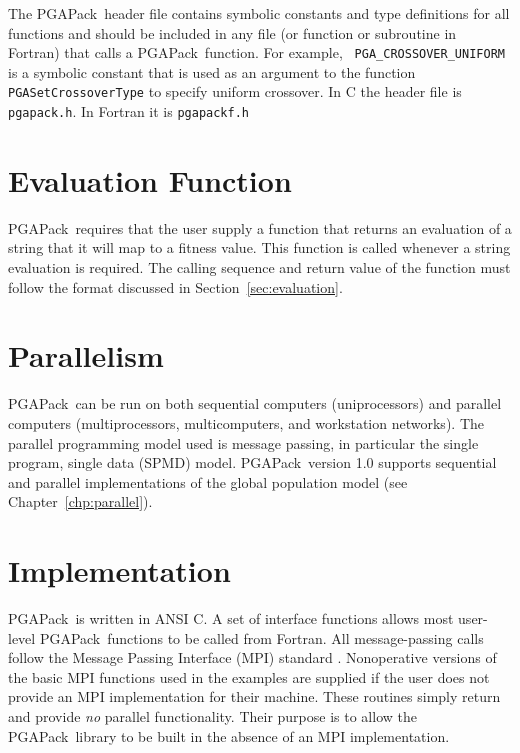 \documentclass{report}
\newcommand{\pga}{PGAPack}
\begin{document}
\begin{sloppypar}
The \pga\ header file contains symbolic constants and type definitions for all
functions and should be included in any file (or function or subroutine in
Fortran) that calls a \pga\ function.  For example, {\tt
PGA\_CROSSOVER\_UNIFORM} is a symbolic constant that is used as an argument
to the function {\tt PGASetCrossoverType} to specify uniform crossover.  In C
the header file is {\tt pgapack.h}.  In Fortran it is {\tt pgapackf.h}
\end{sloppypar}

\section{Evaluation Function}\label{sec:evalfunc}

\pga\ requires that the user supply a function that returns an evaluation of a
string that it will map to a fitness value.  This function is called whenever
a string evaluation is required.  The calling sequence and return value of the
function must follow the format discussed in Section~\ref{sec:evaluation}.

\section{Parallelism}\label{sec:parallel}

\pga\ can be run on both sequential computers (uniprocessors) and parallel 
computers (multiprocessors, multicomputers, and workstation networks).  The
parallel programming model used is message passing, in particular the single
program, single data (SPMD) model.  \pga\ version 1.0 supports sequential and
parallel implementations of the global population model (see
Chapter~\ref{chp:parallel}).

\section{Implementation}\label{sec:implement}

\pga\ is written in ANSI C. A set of interface functions allows most user-level
\pga\ functions to be called from Fortran.  
All message-passing calls follow the
Message Passing Interface (MPI) standard
\cite{MPI-final,GrLuSk94}.  
Nonoperative versions of the basic MPI functions used in the examples are
supplied if the user does not provide an MPI implementation for their machine.
These routines simply return and provide {\em no} parallel functionality.
Their purpose is to allow the \pga\ library to be built in the absence of an
MPI implementation.
\end{document}
